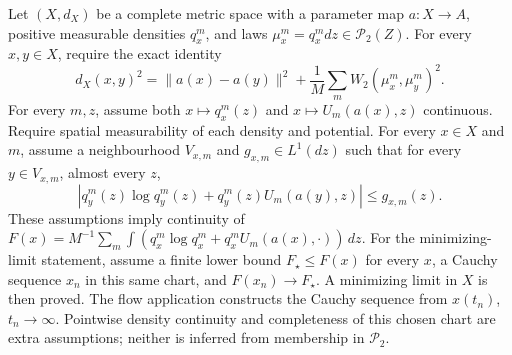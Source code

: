 \documentclass[11pt,a4paper]{report}
\begin{document}
Let \((X,d_X)\) be a complete metric space with a parameter map \(a:X\to A\), positive measurable densities \(q_x^m\), and laws \(\mu_x^m=q_x^m dz\in\mathcal P_2(Z)\). For every \(x,y\in X\), require the exact identity
        \[d_X(x,y)^2=\|a(x)-a(y)\|^2+
          \frac1M\sum_m W_2(\mu_x^m,\mu_y^m)^2.\]
        For every \(m,z\), assume both \(x\mapsto q_x^m(z)\) and \(x\mapsto U_m(a(x),z)\) continuous. Require spatial measurability of each density and potential. For every \(x\in X\) and \(m\), assume a neighbourhood \(V_{x,m}\) and \(g_{x,m}\in L^1(dz)\) such that for every \(y\in V_{x,m}\), almost every \(z\),
        \[\left|q_y^m(z)\log q_y^m(z)+q_y^m(z)U_m(a(y),z)\right|\le g_{x,m}(z).\]
        These assumptions imply continuity of \(F(x)=M^{-1}\sum_m\int(q_x^m\log q_x^m+q_x^mU_m(a(x),\cdot))\,dz\). For the minimizing-limit statement, assume a finite lower bound \(F_\star\le F(x)\) for every \(x\), a Cauchy sequence \(x_n\) in this same chart, and \(F(x_n)\to F_\star\). A minimizing limit in \(X\) is then proved. The flow application constructs the Cauchy sequence from \(x(t_n)\), \(t_n\to\infty\). Pointwise density continuity and completeness of this chosen chart are extra assumptions; neither is inferred from membership in \(\mathcal P_2\).
\end{document}
